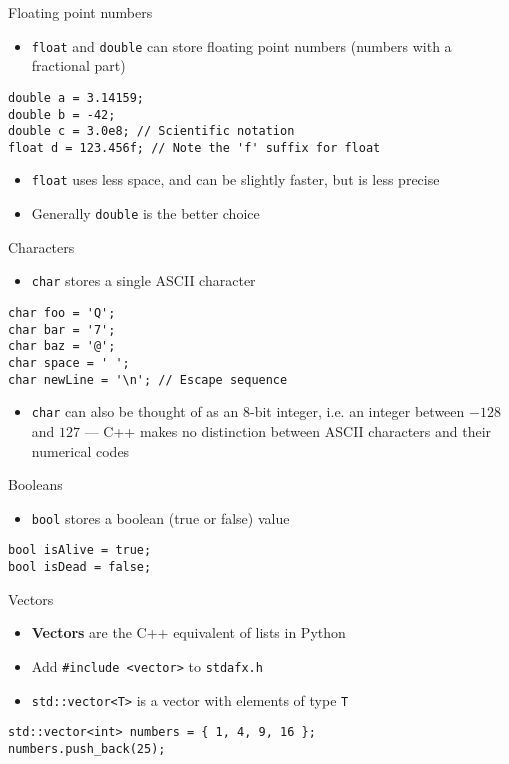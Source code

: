 \begin{frame}[fragile]{Floating point numbers}
	\begin{itemize}
		\item \lstinline{float} and \lstinline{double} can store floating point numbers (numbers with a fractional part)
	\end{itemize}
	\begin{lstlisting}
double a = 3.14159;
double b = -42;
double c = 3.0e8; // Scientific notation
float d = 123.456f; // Note the 'f' suffix for float
	\end{lstlisting}
	\pause
	\begin{itemize}
		\item \lstinline{float} uses less space, and can be slightly faster, but is less precise \pause
		\item Generally \lstinline{double} is the better choice
	\end{itemize}
\end{frame}

\begin{frame}[fragile]{Characters}
	\begin{itemize}
		\item \lstinline{char} stores a single ASCII character
	\end{itemize}
	\begin{lstlisting}
char foo = 'Q';
char bar = '7';
char baz = '@';
char space = ' ';
char newLine = '\n'; // Escape sequence
	\end{lstlisting}
	\pause
	\begin{itemize}
		\item \lstinline{char} can also be thought of as an 8-bit integer, i.e. an integer between $-128$ and $127$ ---
			C++ makes no distinction between ASCII characters and their numerical codes
	\end{itemize}
\end{frame}

\begin{frame}[fragile]{Booleans}
	\begin{itemize}
		\item \lstinline{bool} stores a boolean (true or false) value
	\end{itemize}
	\begin{lstlisting}
bool isAlive = true;
bool isDead = false;
	\end{lstlisting}
\end{frame}

\begin{frame}[fragile]{Vectors}
	\begin{itemize}
		\item \textbf{Vectors} are the C++ equivalent of lists in Python
		\pause
		\item Add \lstinline{#include <vector>} to \texttt{stdafx.h}
		\pause
		\item \lstinline{std::vector<T>} is a vector with elements of type \lstinline{T}
	\end{itemize}
	\pause
	\begin{lstlisting}
std::vector<int> numbers = { 1, 4, 9, 16 };
numbers.push_back(25);
	\end{lstlisting}
\end{frame}

